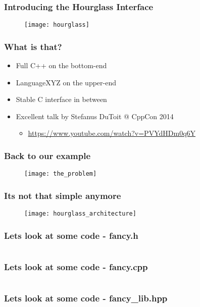 \begin{frame}[c]
  \frametitle{Introducing the Hourglass Interface}
    \begin{figure}
      \centering
      \texttt{[image: hourglass]}
    \end{figure}
\end{frame}

\begin{frame}[c]
  \frametitle{What is that?}\pause{}
  \begin{itemize}
    \item{Full C++ on the bottom-end}\pause
    \item{LanguageXYZ on the upper-end}\pause
    \item{Stable C interface in between}\pause
    \item{Excellent talk by Stefanus DuToit @ CppCon 2014}
      \begin{itemize}
        \item{\url{https://www.youtube.com/watch?v=PVYdHDm0q6Y}}
      \end{itemize}
  \end{itemize}
\end{frame}

\begin{frame}[c]
  \frametitle{Back to our example}
  \begin{figure}
    \centering
    \texttt{[image: the\_problem]}
  \end{figure}
\end{frame}

\begin{frame}[c]
  \frametitle{Its not that simple anymore}
  \begin{figure}
    \centering
    \texttt{[image: hourglass\_architecture]}
  \end{figure}
\end{frame}

\begin{frame}[c]
  \frametitle{Lets look at some code - fancy.h}
  \inputminted[firstline=4,lastline=15]{cpp}{code/fancy2/fancy.h}
\end{frame}

\begin{frame}[c]
  \frametitle{Lets look at some code - fancy.cpp}
  \inputminted[firstline=4]{cpp}{code/fancy2/fancy.cpp}
\end{frame}

\begin{frame}[c]
  \frametitle{Lets look at some code - fancy\_lib.hpp}
  \inputminted[firstline=4,lastline=12]{cpp}{code/fancy2/fancy_lib.hpp}
\end{frame}

